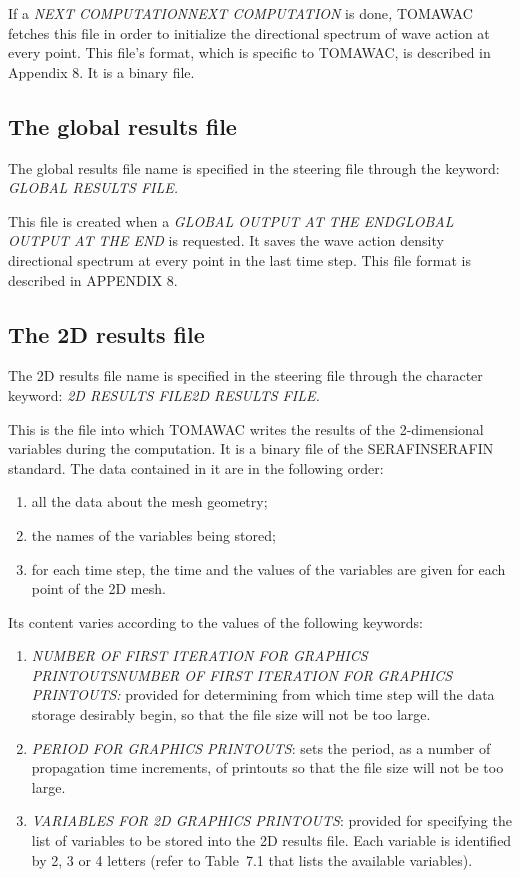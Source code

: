  If a \textit{NEXT COMPUTATIONNEXT COMPUTATION} is done\textit{, }TOMAWAC fetches this file in order to initialize the directional spectrum of wave action at every point. This file's format, which is specific to TOMAWAC, is described in Appendix 8. It is a binary file.


\subsection{ The global results file}

 The global results file name is specified in the steering file through the keyword: \textit{GLOBAL RESULTS FILE.}

 This file is created when a \textit{GLOBAL OUTPUT AT THE ENDGLOBAL OUTPUT AT THE END} is requested. It saves the wave action density directional spectrum at every point in the last time step. This file format is described in APPENDIX 8.


\subsection{ The 2D results file }

 The 2D results file name is specified in the steering file through the character keyword: \textit{2D RESULTS FILE2D RESULTS FILE.}

 This is the file into which TOMAWAC writes the results of the 2-dimensional variables during the computation. It is a binary file of the SERAFINSERAFIN standard. The data contained in it are in the following order:

\begin{enumerate}
\item  all the data about the mesh geometry;

\item  the names of the variables being stored;

\item  for each time step, the time and the values of the variables are given for each point of the 2D mesh.
\end{enumerate}

 Its content varies according to the values of the following keywords:

\begin{enumerate}
\item  \textit{NUMBER OF FIRST ITERATION FOR GRAPHICS PRINTOUTSNUMBER OF FIRST ITERATION FOR GRAPHICS PRINTOUTS:} provided for determining from which time step will the data storage desirably begin, so that the file size will not be too large.

\item  \textit{PERIOD FOR GRAPHICS PRINTOUTS}: sets the period, as a number of propagation time increments, of printouts so that the file size will not be too large.

\item  \textit{VARIABLES FOR 2D GRAPHICS PRINTOUTS}: provided for specifying the list of variables to be stored into the 2D results file. Each variable is identified by 2, 3 or 4 letters (refer to Table~7.1 that lists the available variables).
\end{enumerate}



